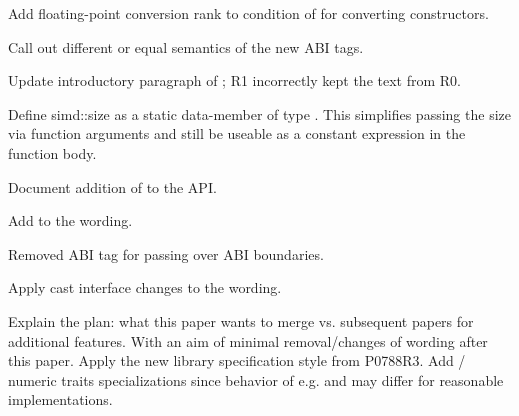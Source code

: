 \begin{revision}
\item Add floating-point conversion rank to condition of  for converting constructors.
\item Call out different or equal semantics of the new ABI tags.
\item Update introductory paragraph of ; R1 incorrectly kept the text from R0.
\item Define simd::size as a  static data-member of type . This simplifies passing the size via function arguments and still be useable as a constant expression in the function body.
\item Document addition of  to the API.
\item Add  to the wording.
\item Removed ABI tag for passing  over ABI boundaries.
\item Apply cast interface changes to the wording.
\item Explain the plan: what this paper wants to merge vs. subsequent papers for additional features. With an aim of minimal removal/changes of wording after this paper.
  \todo Apply the new library specification style from P0788R3.
  \todo Add  / numeric traits specializations since behavior of e.g.  and  may differ for reasonable implementations.
\end{revision}
